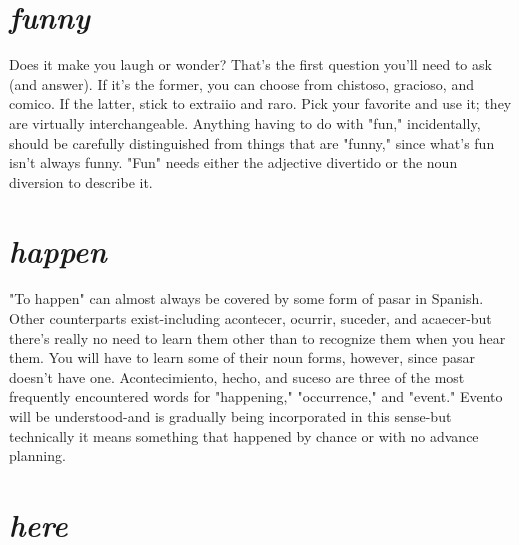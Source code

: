 \documentclass[14pt,a4paper,oneside]{memoir}
\begin{document}
\section{\emph{funny}}

Does it make you laugh or wonder? That's the first question
you'll need to ask (and answer). If it's the former, you can choose from
chistoso, gracioso, and comico. If the latter, stick to extraiio and raro.
Pick your favorite and use it; they are virtually interchangeable. Anything having to do with "fun," incidentally, should be carefully distinguished from things that are "funny," since what's fun isn't always
funny. "Fun" needs either the adjective divertido or the noun diversion to describe it.

\section{\emph{happen}}

"To happen" can almost always be covered by some form of
pasar in Spanish. Other counterparts exist-including acontecer, ocurrir, suceder, and acaecer-but there's really no need to learn them
other than to recognize them when you hear them. You will have to
learn some of their noun forms, however, since pasar doesn't have one.
Acontecimiento, hecho, and suceso are three of the most frequently
encountered words for "happening," "occurrence," and "event."
Evento will be understood-and is gradually being incorporated in this
sense-but technically it means something that happened by chance
or with no advance planning.

\section{\emph{here}}
\end{document}

